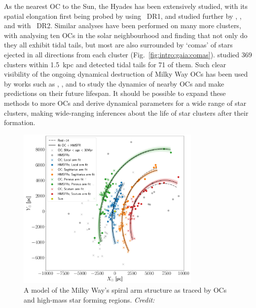 As the nearest OC to the Sun, the Hyades has been extensively studied, with its spatial elongation first being probed by \cite{reino_gaia_study_2018} using \gaia\ DR1, and studied further by \cite{lodieu_3d_view_2019}, \cite{röser_hyades_tidal_2019}, and \cite{meingast_extended_stellar_2019} with \gaia\ DR2. Similar analyses have been performed on many more clusters, with \cite{meingast_extended_2021} analysing ten OCs in the solar neighbourhood and finding that not only do they all exhibit tidal tails, but most are also surrounded by `comas' of stars ejected in all directions from each cluster (Fig.~\ref{fig:intro:gaia:comas}). \cite{tarricq_structural_2022} studied 369 clusters within 1.5~kpc and detected tidal tails for 71 of them. Such clear visibility of the ongoing dynamical destruction of Milky Way OCs has been used by works such as \cite{yeh_ruprecht_2019}, \cite{oh_kinematic_modelling_2020}, and \cite{pang_3d_2021} to study the dynamics of nearby OCs and make predictions on their future lifespan. It should be possible to expand these methods to more OCs and derive dynamical parameters for a wide range of star clusters, making wide-ranging inferences about the life of star clusters after their formation.

\begin{figure}[t]
	\centering
	\includegraphics[width=0.8\textwidth]{fig/c1/spiral_arms.png}
	\caption[A model of the Milky Way's spiral arm structure as traced by OCs and high-mass star forming regions]{A model of the Milky Way's spiral arm structure as traced by OCs and high-mass star forming regions. \emph{Credit:} \cite{castro-ginard_milky_2021}}
	\label{fig:intro:gaia:spiral}
\end{figure}

